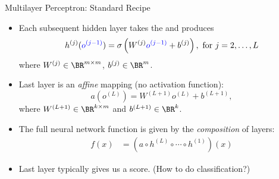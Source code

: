 \documentclass[usenames,dvipsnames,notes,11pt,aspectratio=169]{beamer}
\begin{document}
\begin{frame}{Multilayer Perceptron: Standard Recipe}
\begin{itemize}[<+->]
\item Each subsequent hidden layer takes the  and produces
\[
h^{(j)}({\color{blue}o^{(j-1)}})=\sigma\left(W^{(j)}{\color{blue}o^{(j-1)}}+b^{(j)}\right),\text{ for }j=2,\ldots,L
\]
where $W^{(j)}\in\BR^{m\times m}$, $b^{(j)}\in\BR^{m}$.

\item Last layer is an \emph{affine} mapping (no activation function): 
\[
a(o^{(L)})=W^{(L+1)}o^{(L)}+b^{(L+1)},
\]
where $W^{(L+1)}\in\BR^{k\times m}$ and $b^{(L+1)}\in\BR^{k}$.

\item The full neural network function is given by the \emph{composition} of
layers:
\begin{align}
f(x) &= \left(a\circ h^{(L)}\circ\cdots\circ h^{(1)}\right)(x)
\end{align}

\item Last layer typically gives us a score. (How to do classification?)
\end{itemize}
\end{frame}
\end{document}
